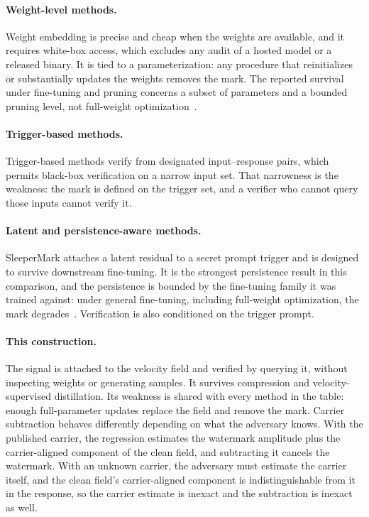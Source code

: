 \documentclass[11pt]{article}
\begin{document}
\paragraph{Weight-level methods.}
Weight embedding is precise and cheap when the weights are available,
and it requires white-box access, which excludes any audit of a hosted
model or a released binary. It is tied to a parameterization: any
procedure that reinitializes or substantially updates the weights
removes the mark. The reported survival under fine-tuning and pruning
concerns a subset of parameters and a bounded pruning level, not
full-weight optimization~\cite{uchida2017embedding}.

\paragraph{Trigger-based methods.}
Trigger-based methods verify from designated input--response pairs,
which permits black-box verification on a narrow input set. That
narrowness is the weakness: the mark is defined on the trigger set, and
a verifier who cannot query those inputs cannot verify it.

\paragraph{Latent and persistence-aware methods.}
SleeperMark attaches a latent residual to a secret prompt trigger and
is designed to survive downstream fine-tuning. It is the strongest
persistence result in this comparison, and the persistence is bounded
by the fine-tuning family it was trained against: under general
fine-tuning, including full-weight optimization, the mark
degrades~\cite{wang2025sleepermark}. Verification is also conditioned
on the trigger prompt.

\paragraph{This construction.}
The signal is attached to the velocity field and verified by querying
it, without inspecting weights or generating samples. It survives
compression and velocity-supervised distillation. Its weakness is shared with every method in the table: enough
full-parameter updates replace the field and remove the mark. Carrier subtraction behaves differently depending on what the adversary
knows. With the published carrier, the regression estimates the
watermark amplitude plus the carrier-aligned component of the clean
field, and subtracting it cancels the watermark. With an unknown carrier, the
adversary must estimate the carrier itself, and the clean field's
carrier-aligned component is indistinguishable from it in the response,
so the carrier estimate is inexact and the subtraction is inexact as
well.
\end{document}
